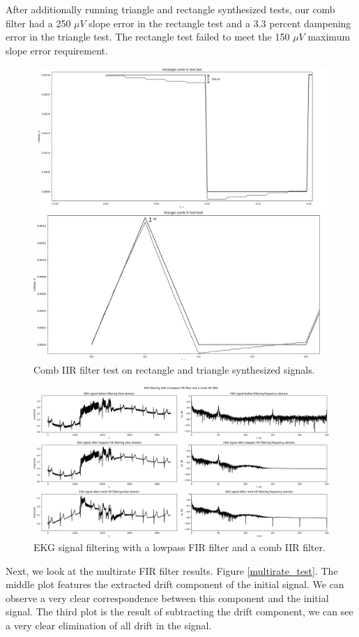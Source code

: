 \documentclass[10pt,a4paper,twocolumn]{article}
\begin{document}
After additionally running triangle and rectangle synthesized tests, our comb filter had a 250 $\mu V$ slope error in the rectangle test and a 3.3 percent dampening error in the triangle test. The rectangle test failed to meet the 150 $\mu V$ maximum slope error requirement.

\begin{figure} %
	[h]
	\centering
	\includegraphics*[width= .5\columnwidth]{comb_test.png} %
	\caption{Comb IIR filter test on rectangle and triangle synthesized signals.}
	\label{comb_test}
	\vspace{6pt}
\end{figure}


\begin{figure} %
	[h]
	\centering
	\includegraphics*[width=.95\columnwidth]{res1.png} %
	\caption{EKG signal filtering with a lowpass FIR filter and a comb IIR filter.}
	\label{res1}
	\vspace{6pt}
\end{figure}


Next, we look at the multirate FIR filter results. Figure \ref{multirate_test}. The middle plot features the extracted drift component of the initial signal. We can observe a very clear correspondence between this component and the initial signal. The third plot is the result of subtracting the drift component, we can see a very clear elimination of all drift in the signal.
\end{document}
